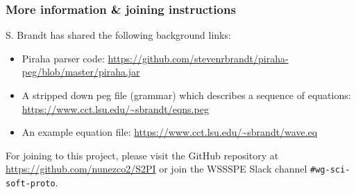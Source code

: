\subsubsection{More information \& joining instructions}

S. Brandt has shared the following background links:

\begin{itemize}
  \item Piraha parser code: \url{https://github.com/stevenrbrandt/piraha-peg/blob/master/piraha.jar}
  \item A stripped down peg file (grammar) which describes a sequence of equations:
\url{https://www.cct.lsu.edu/~sbrandt/eqns.peg}
  \item An example equation file: \url{https://www.cct.lsu.edu/~sbrandt/wave.eq}
\end{itemize}

For joining to this project, please visit the GitHub repository at
\url{https://github.com/nunezco2/S2PI} or join the WSSSPE Slack channel
\texttt{\#wg-sci-soft-proto}.
